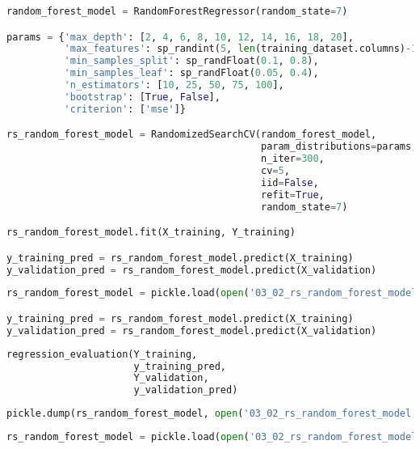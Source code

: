 \begin{lstlisting}[language=Python]
random_forest_model = RandomForestRegressor(random_state=7)

params = {'max_depth': [2, 4, 6, 8, 10, 12, 14, 16, 18, 20],
          'max_features': sp_randint(5, len(training_dataset.columns)-1),
          'min_samples_split': sp_randFloat(0.1, 0.8),
          'min_samples_leaf': sp_randFloat(0.05, 0.4),
          'n_estimators': [10, 25, 50, 75, 100],
          'bootstrap': [True, False],
          'criterion': ['mse']}

rs_random_forest_model = RandomizedSearchCV(random_forest_model,
                                            param_distributions=params,
                                            n_iter=300,
                                            cv=5,
                                            iid=False,
                                            refit=True,
                                            random_state=7)

rs_random_forest_model.fit(X_training, Y_training)

y_training_pred = rs_random_forest_model.predict(X_training)
y_validation_pred = rs_random_forest_model.predict(X_validation)
\end{lstlisting}

\begin{lstlisting}[language=Python]
rs_random_forest_model = pickle.load(open('03_02_rs_random_forest_model.pickle', 'rb'))

y_training_pred = rs_random_forest_model.predict(X_training)
y_validation_pred = rs_random_forest_model.predict(X_validation)
\end{lstlisting}

\begin{lstlisting}[language=Python]
regression_evaluation(Y_training,
                      y_training_pred,
                      Y_validation,
                      y_validation_pred)
\end{lstlisting}

\begin{lstlisting}[language=Python]
pickle.dump(rs_random_forest_model, open('03_02_rs_random_forest_model.pickle', 'wb'))
\end{lstlisting}

\begin{lstlisting}[language=Python]
rs_random_forest_model = pickle.load(open('03_02_rs_random_forest_model.pickle', 'rb'))
\end{lstlisting}

